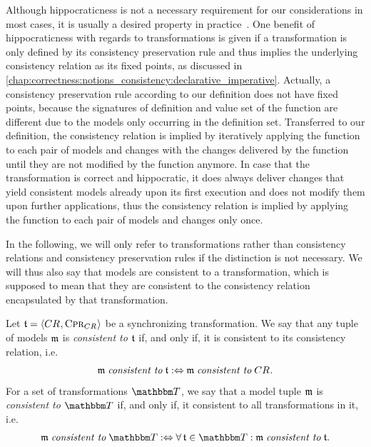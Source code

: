 Although hippocraticness is not a necessary requirement for our considerations in most cases, it is usually a desired property in practice~\cite{stevens2010sosym}.
One benefit of hippocraticness with regards to transformations is given if a transformation is only defined by its consistency preservation rule and thus implies the underlying consistency relation as its fixed points, as discussed in \autoref{chap:correctness:notions_consistency:declarative_imperative}.
Actually, a consistency preservation rule according to our definition does not have fixed points, because the signatures of definition and value set of the function are different due to the models only occurring in the definition set.
Transferred to our definition, the consistency relation is implied by iteratively applying the function to each pair of models and changes with the changes delivered by the function until they are not modified by the function anymore.
In case that the transformation is correct and hippocratic, it does always deliver changes that yield consistent models already upon its first execution and does not modify them upon further applications, thus the consistency relation is implied by applying the function to each pair of models and changes only once.

In the following, we will only refer to transformations rather than consistency relations and consistency preservation rules if the distinction is not necessary.
We will thus also say that models are consistent to a transformation, which is supposed to mean that they are consistent to the consistency relation encapsulated by that transformation.

\begin{definition}
    \label{def:consistencytransformation}
    Let $\mathfrak{t} = \langle CR_{}, \textsc{Cpr}_{CR_{}} \rangle$ be a synchronizing transformation.
    We say that any tuple of models $\mathfrak{m}$ is \emph{consistent to} $\mathfrak{t}$ if, and only if, it is consistent to its consistency relation, i.e.
    \begin{align*}
        \mathfrak{m} \; \textit{consistent to} \; \mathfrak{t} :\Leftrightarrow \mathfrak{m} \; \textit{consistent to} \; CR_{}.
    \end{align*}
    For a set of transformations $\transformationset{T}$, we say that a model tuple $\mathfrak{m}$ is \emph{consistent to} $\transformationset{T}$ if, and only if, it consistent to all transformations in it, i.e.
    \begin{align*}
        \modeltuple{m} \consistenttomath \transformationset{T} \equivalentperdefinition \forall \transformation{t} \in \transformationset{T} : \modeltuple{m} \consistenttomath \transformation{t}.
    \end{align*}
\end{definition}

